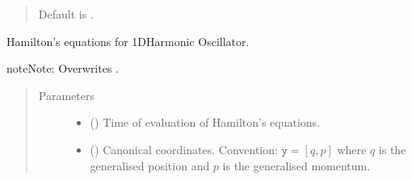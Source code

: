 \documentclass[a4paper,landscape,10pt,english]{sphinxmanual}
\begin{document}
\begin{fulllineitems}
\begin{fulllineitems}
\begin{quote}
\begin{description}
\begin{itemize}
Default is  .


\end{itemize}

\end{description}\end{quote}

\end{fulllineitems}


\begin{fulllineitems}
\label{\detokenize{code_docs/simulation_api.simulation:simulation_api.simulation.simulations.HarmonicOsc1D.dyn_sys_eqns}}
Hamilton’s equations for 1D\sphinxhyphen{}Harmonic Oscillator.

\begin{sphinxadmonition}{note}{Note:}
Overwrites {\hyperref[\detokenize{code_docs/simulation_api.simulation:simulation_api.simulation.simulations.Simulation.dyn_sys_eqns}]{}}.
\end{sphinxadmonition}
\begin{quote}\begin{description}
\item[{Parameters}] \leavevmode\begin{itemize}
\item {} 
 () \textendash{} Time of evaluation of Hamilton’s equations.

\item {} 
 (\sphinxstyleliteralemphasis{\sphinxupquote{, }}\sphinxstyleliteralemphasis{\sphinxupquote{ (}}\sphinxstyleliteralemphasis{\sphinxupquote{,}}\sphinxstyleliteralemphasis{\sphinxupquote{)}}) \textendash{} Canonical coordinates.
Convention: \(\texttt{y} = [q, p]\) where \(q\) is the
generalised position and \(p\) is the generalised momentum.


\end{itemize}
\end{description}
\end{quote}
\end{fulllineitems}
\end{fulllineitems}
\end{document}
